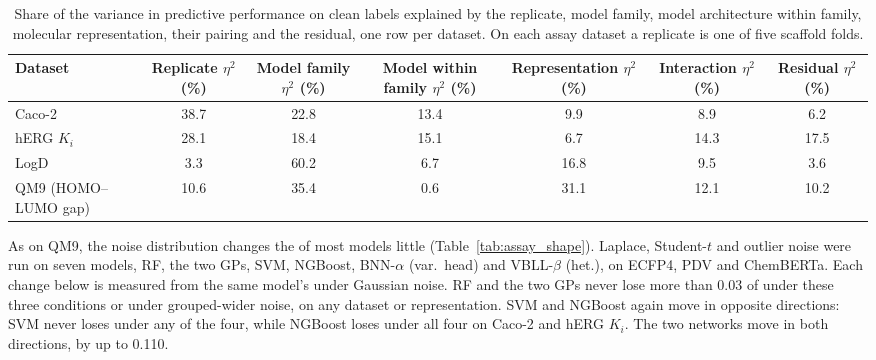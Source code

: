 \begin{table}[!htbp]
\centering
\small
\begin{adjustbox}{max width=\textwidth,max totalheight=0.78\textheight}
\begin{tabular}{lcccccc}
\toprule
Dataset & Replicate $\eta^2$ (\%) & Model family $\eta^2$ (\%) & Model within family $\eta^2$ (\%) & Representation $\eta^2$ (\%) & Interaction $\eta^2$ (\%) & Residual $\eta^2$ (\%) \\
\midrule
Caco-2 & 38.7 & 22.8 & 13.4 & 9.9 & 8.9 & 6.2 \\
hERG $K_i$ & 28.1 & 18.4 & 15.1 & 6.7 & 14.3 & 17.5 \\
LogD & 3.3 & 60.2 & 6.7 & 16.8 & 9.5 & 3.6 \\
QM9 (HOMO--LUMO gap) & 10.6 & 35.4 & 0.6 & 31.1 & 12.1 & 10.2 \\
\bottomrule
\end{tabular}
\end{adjustbox}
\caption[Variance decomposition of clean predictive performance by dataset.]{Share of the variance in predictive performance on clean labels explained by the replicate, model family, model architecture within family, molecular representation, their pairing and the residual, one row per dataset. On each assay dataset a replicate is one of five scaffold folds.}
\label{tab:variance_clean}
\end{table}

As on QM9, the noise distribution changes the \aucnorm{} of most models little (Table~\ref{tab:assay_shape}). Laplace, Student-$t$ and outlier noise were run on seven models, RF, the two GPs, SVM, NGBoost, BNN-$\alpha$ (var.\ head) and VBLL-$\beta$ (het.), on ECFP4, PDV and ChemBERTa. Each change below is measured from the same model's \aucnorm{} under Gaussian noise. RF and the two GPs never lose more than 0.03 of \aucnorm{} under these three conditions or under grouped-wider noise, on any dataset or representation. SVM and NGBoost again move in opposite directions: SVM never loses \aucnorm{} under any of the four, while NGBoost loses under all four on Caco-2 and hERG $K_i$. The two networks move in both directions, by up to 0.110.

